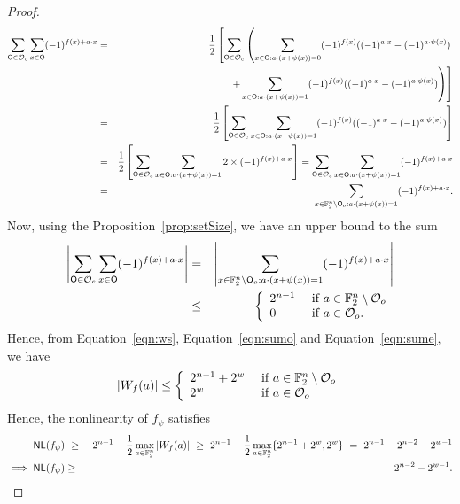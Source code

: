 \documentclass{llncs}
\begin{document}
\begin{proof}
\begin{eqnarray*}
\sum_{\mathsf{O} \in \mathcal{O}_e} \sum_{x \in \mathsf{O}} (-1)^{ f(x) + a \cdot x} 
& = & \frac{1}{2} \left[ \sum_{\mathsf{O} \in \mathcal{O}_e} \left( \sum_{x \in \mathsf{O} : a \cdot (x + \psi(x))= 0} (-1)^{f(x)} ((-1)^{ a \cdot x} - (-1)^{a \cdot \psi(x)})   \right. \right. \\
&& ~~~~~~~~~~~~~~~\left.  \left. +  \sum_{x \in \mathsf{O} : a \cdot (x + \psi(x))= 1 } (-1)^{f(x)} ((-1)^{ a \cdot x} - (-1)^{a \cdot \psi(x)})  \right) \right] \\
& = & \frac{1}{2} \left[ \sum_{\mathsf{O} \in \mathcal{O}_e} \sum_{x \in \mathsf{O} : a \cdot (x + \psi(x))= 1} (-1)^{f(x)} ((-1)^{ a \cdot x} - (-1)^{a \cdot \psi(x)})  \right] \\
& = & \frac{1}{2} \left[ \sum_{\mathsf{O} \in \mathcal{O}_e} \sum_{x \in \mathsf{O} : a \cdot (x + \psi(x))= 1 } 2 \times (-1)^{f(x)+ a \cdot x}  \right] = \sum_{\mathsf{O} \in \mathcal{O}_e} \sum_{x \in \mathsf{O} : a \cdot (x + \psi(x))= 1 } (-1)^{f(x)+ a \cdot x} \\
& = & \sum_{x \in \mathbb{F}_2^n\setminus \mathsf{O}_o : a \cdot (x + \psi(x))=1} (-1)^{f(x)+ a \cdot x}.
\end{eqnarray*}
Now, using the Proposition~\ref{prop:setSize}, we have an upper bound to the sum
\begin{eqnarray}
\left| \sum_{\mathsf{O} \in \mathcal{O}_e} \sum_{x \in \mathsf{O}} (-1)^{ f(x) + a \cdot x} \right| 
    & = & \left|\sum_{x \in \mathbb{F}_2^n\setminus \mathsf{O}_o : a \cdot (x + \psi(x))=1} (-1)^{f(x)+ a \cdot x}\right| \nonumber\\
    & \leq & \left\{
    \begin{array}{ll}
        2^{n-1} & \text{ if } a \in \mathbb{F}_2^n \setminus \mathcal{O}_o \\
        0           & \text{ if } a \in \mathcal{O}_o. \label{eqn:sume}
    \end{array}   \right.  
\end{eqnarray} 
Hence, from Equation~\ref{eqn:ws}, Equation~\ref{eqn:sumo} and Equation~\ref{eqn:sume}, we have
\begin{equation}\label{eqn:ws2}
|W_{f}(a)| \leq \left\{ \begin{array}{ll}
        2^{n-1} + 2^w & \text{ if } a \in \mathbb{F}_2^n \setminus \mathcal{O}_o \\
        2^w        & \text{ if } a \in \mathcal{O}_o
    \end{array}   \right. 
\end{equation}
Hence, the nonlinearity of $f_\psi$ satisfies
\begin{eqnarray*}
\mathsf{NL}(f_\psi) & ~\ge~ & 2^{n-1}-\frac{1}{2} \max_{a\in \mathbb{F}_2^n}| W_{f}(a)|
~\geq~ 2^{n-1}-\frac{1}{2} \max_{a\in \mathbb{F}_2^n} \{2^{n-1}+2^w,2^w \} ~=~ 2^{n-1} - 2^{n-2} - 2^{w-1} \\
\implies \mathsf{NL}(f_\psi) & \ge & 2^{n-2} - 2^{w-1}.
\end{eqnarray*}
\end{proof}
\end{document}

